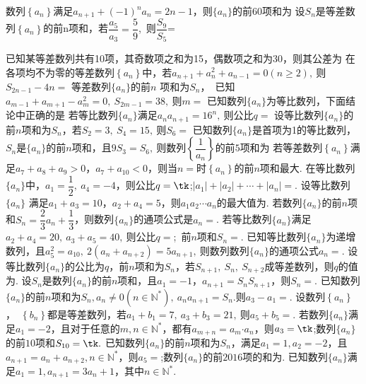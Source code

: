 \documentclass{BHCexam}
\begin{document}
\begin{questions}
\qs 数列$ \left\{a_n\right\} $满足$ a_{n+1}+(-1)^na_n=2n-1 $，则$\{a_n\}$的前$ 60 $项和为\xx
{}
\qs 设$S_n$是等差数列$\left\{a_n\right\}$的前n项和，若$\dfrac{a_5}{a_3}=\dfrac{5}{9}$,~则$ \dfrac{S_9}{S_5} $=\xx
{}

\qs 已知某等差数列共有10项，其奇数项之和为15，偶数项之和为30，则其公差为\xx
{}
\qs 在各项均不为零的等差数列$\left\{a_n\right\}$中，若$ a_{n+1}+a^2_n+a_{n-1}=0(n\ge 2),~$则$ S_{2n-1}-4n= $\xx
{}
\qs 等差数列$\{a_n\}$的前$ n $ 项和为$S_n$，~已知$ a_{m-1}+a_{m+1}-a_m^2=0,~S_{2m-1}=38,~ $则$ m= $\xx
{}
\qs 已知数列$\{a_n\}$为等比数列，下面结论中正确的是\xx
{}
\qs 若等比数列$\{a_n\}$满足$ a_na_{n+1}=16^n,~ $则公比$ q= $\xx
{}
\qs 设等比数列$\{a_n\}$的前$n$项和为$S_n$，若$ S_2=3,~S_4=15,~ $则$ S_6= $\xx
{}
\qs 已知数列$\{a_n\}$是首项为1的等比数列，$S_n$是$\{a_n\}$的前$ n $项和，且$ 9S_3=S_6 ,~$则数列$ \left\{\dfrac{1}{a_n}\right\} $的前$ 5 $项和为\xx
{}
\qs 若等差数列$\left\{a_n\right\}$满足$ a_7+a_8+a_9>0$，$ a_7+a_{10}<0 $，则当$n=$\tk 时$\left\{a_n\right\}$的前$n$项和最大.  
\qs 在等比数列$\{a_n\}$中，$a_1=\dfrac{1}{2},~a_4=-4$，则公比$ q=\tk $;$ |a_1|+|a_2|+\cdots+|a_n|= $\tk. 
\qs 设等比数列$\{a_n\}$  满足$ a_1+a_3=10 $，$a_2+a_4=5$，则$ a_1a_2\cdots a_n $的最大值为\tk.
\qs 若数列$\{a_n\}$的前$n$项和$S_n=\dfrac{2}{3}a_n+\dfrac{1}{3}$，则数列$\{a_n\}$的通项公式是$a_n=$\tk. 
\qs 若等比数列$\{a_n\}$满足$ a_2+a_4=20,~a_3+a_5=40,~$则公比$ q= $\tk;~前$ n $项和$S_n=$\tk.
\qs 已知等比数列$\{a_n\}$为递增数列，且$ a_5^2=a_{10},~2(a_n+a_{n+2})=5a_{n+1},~ $则数列数列$\{a_n\}$的通项公式$ a_n= $\tk.
\qs 设等比数列$\{a_n\}$的公比为$ q $，前$n$项和为$S_n$，若$ S_{n+1},~S_n,~S_{n+2} $成等差数列，则$ q $的值为\tk.
\question
设$S_n$是数列$\{a_n\}$的前$n$项和，且$a_1=-1$，$a_{n+1}=S_nS_{n+1}$，则$S_n=$\tk.
\qs 已知数列$\{a_n\}$的前$n$项和为$S_n,a_n\ne0\left(n\in\mathbb{N^*}\right),~a_na_{n+1}=S_n$.则$ a_3-a_1 =$\tk.
\qs 设数列$\left\{a_n\right\}$，~$\left\{b_n\right\}$都是等差数列，若$ a_1+b_1=7,~a_3+b_3=21,~ $则$ a_5+b_5= $\tk.
\qs 若数列$\{a_n\}$满足$a_1=-2$，且对于任意的$ m,n \in\mathbb{N^*}$，都有$ a_{m+n}=a_m\bm{\cdot}a_n $，则$ a_3=\tk $;数列$\{a_n\}$的前$ 10 $项和$ S_{10}=\tk. $
\qs 已知数列$\{a_n\}$的前$n$项和为$S_n$，满足$a_1=1,a_2=-2$，且$a_{n+1}=a_{n}+a_{n+2},n\in\mathbb{N^*}$，则$ a_5= $\tk;数列$\{a_n\}$的前$ 2016 $项的和为\tk.
\clearpage
\question
已知数列$\{a_n\}$满足$a_1=1,a_{n+1}=3a_n+1$，其中$n\in \mathbb{N^*}.$
\begin{parts}

\end{parts}
\end{questions}
\end{document}
